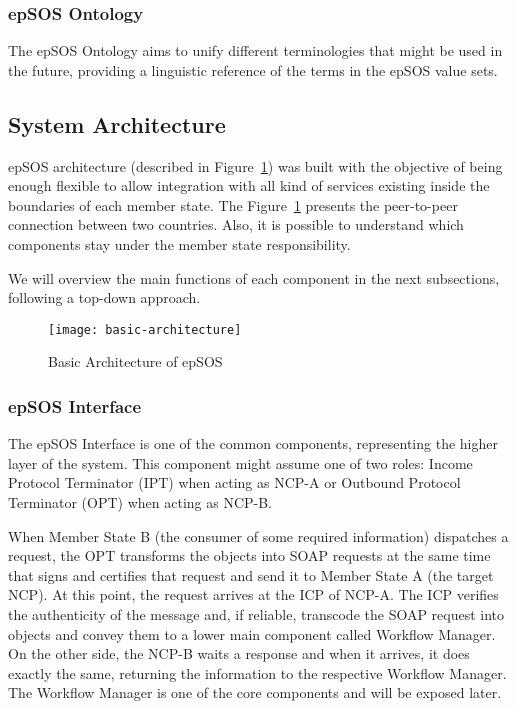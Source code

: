 \subsubsection{epSOS Ontology}
The epSOS Ontology aims to unify different terminologies that might be used in the future, providing a linguistic reference of the terms in the epSOS value sets.



\subsection{System Architecture}

epSOS architecture (described in Figure~\ref{fig:epsos-architecture}) was built with the objective of being enough flexible to allow integration with all kind of services existing inside the boundaries of each member state. The Figure~\ref{fig:epsos-architecture} presents the peer-to-peer connection between two countries. Also, it is possible to understand which components stay under the member state responsibility.

We will overview the main functions of each component in the next subsections, following a top-down approach.

\begin{figure}[t]
\texttt{[image: basic-architecture]}
\caption[Basic Architecture of epSOS]{Basic Architecture of epSOS~\citep{EpSOS}}
\label{fig:epsos-architecture}
\end{figure}

\subsubsection{epSOS Interface}
The epSOS Interface is one of the common components, representing the higher layer of the system. This component might assume one of two roles: Income Protocol Terminator (IPT) when acting as NCP-A or Outbound Protocol Terminator (OPT) when acting as NCP-B.

When Member State B (the consumer of some required information) dispatches a request, the OPT transforms the objects into SOAP requests at the same time that signs and certifies that request and send it to Member State A (the target NCP). At this point, the request arrives at the ICP of NCP-A. The ICP verifies the authenticity of the message and, if reliable, transcode the SOAP request into objects and convey them to a lower main component called Workflow Manager. On the other side, the NCP-B waits a response and when it arrives, it does exactly the same, returning the information to the respective Workflow Manager. The Workflow Manager is one of the core components and will be exposed later.

